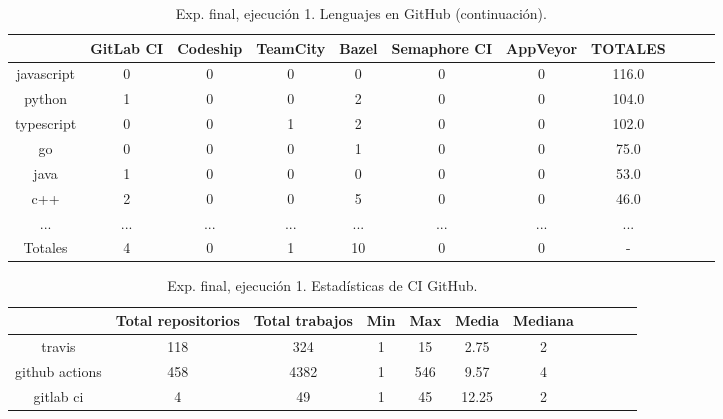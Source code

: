 \begin{table}
  \centering
  \caption{Exp. final, ejecución 1. Lenguajes en GitHub (continuación).}
  \label{tab:tabla_f1_2b}

\begin{footnotesize}
\renewcommand{\arraystretch}{1.5} %
\begin{tabular}{ccccccccccc}
  \hline
  {} &  GitLab CI &  Codeship &  TeamCity &  Bazel &  Semaphore CI &  AppVeyor &  TOTALES \\
  \hline
  javascript       &        0 &         0 &         0 &      0 &             0 &         0 &    116.0 \\
  python           &        1 &         0 &         0 &      2 &             0 &         0 &    104.0 \\
  typescript       &        0 &         0 &         1 &      2 &             0 &         0 &    102.0 \\
  go               &        0 &         0 &         0 &      1 &             0 &         0 &     75.0 \\
  java             &        1 &         0 &         0 &      0 &             0 &         0 &     53.0 \\
  c++              &        2 &         0 &         0 &      5 &             0 &         0 &     46.0 \\
  ...              &      ... &       ... &       ... &    ... &           ... &       ... &      ... \\
  \hline
  Totales          &        4 &         0 &         1 &     10 &             0 &         0 &        - \\
 \end{tabular}
\end{footnotesize}

\end{table}

\begin{table}
  \centering
  \caption{Exp. final, ejecución 1. Estadísticas de CI GitHub.}
  \label{tab:tabla_f1_3}

\begin{footnotesize}
\renewcommand{\arraystretch}{1.5} %
\begin{tabular}{ccccccccccc}
  \hline
  {} &  Total repositorios &  Total trabajos &  Min &  Max &  Media &  Mediana \\
  \hline
  travis         &        118 &         324 &    1 &   15 &   2.75 &        2 \\
  github actions &        458 &        4382 &    1 &  546 &   9.57 &        4 \\
  gitlab ci      &          4 &          49 &    1 &   45 &  12.25 &        2 \\
 \end{tabular}
\end{footnotesize}

\end{table}

